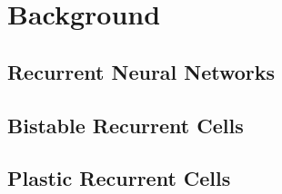 \section*{Background}

\subsection*{Recurrent Neural Networks}

\subsection*{Bistable Recurrent Cells}

\subsection*{Plastic Recurrent Cells}